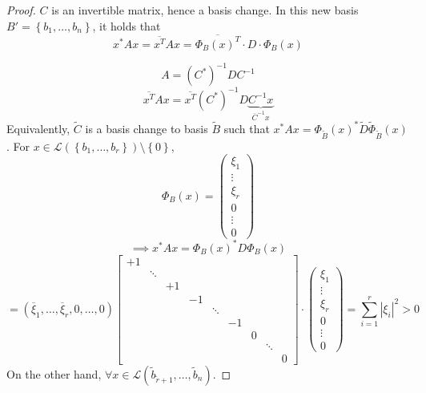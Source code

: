 \documentclass{article}
\newcommand{\set}[1]{\left\{#1\right\}}
\newcommand{\card}[1]{\left|#1\right|}
\begin{document}
\begin{proof}
  $C$ is an invertible matrix, hence a basis change.
  In this new basis $B' = \set{b_1, \dots, b_n}$, it holds that
  \[ x^* A x = \overline{x^T} A x = \overline{\Phi_B(x)^T} \cdot D \cdot \Phi_B(x) \]

  \[ A = (C^*)^{-1} D C^{-1} \]
  \[ \overline{x^T} A x = \overline{x^T} (C^*)^{-1} D \underbrace{C^{-1} x}_{\overline{C}^{-1} x} \]
  Equivalently, $\tilde C$ is a basis change to basis $\tilde B$
  such that $x^* Ax = \Phi_{\tilde B}(x)^* \tilde D \tilde\Phi_{\tilde B}(x)$.
  For $x \in \mathcal L(\set{b_1, \dots, b_r}) \setminus \set{0}$,
  \[ \Phi_B(x) = \begin{pmatrix} \xi_1 \\ \vdots \\ \xi_r \\ 0 \\ \vdots \\ 0 \end{pmatrix} \]
  \[ \implies x^* A x = \Phi_B(x)^* D \Phi_B(x) \]
  \[
    = (\overline{\xi}_1, \dots, \overline{\xi}_r, 0, \dots, 0)
    \begin{bmatrix}
       +1 &        &       &    &        &    &   &        & \\
          & \ddots &       &    &        &    &   &        & \\
          &        &    +1 &    &        &    &   &        & \\
          &        &       & -1 &        &    &   &        & \\
          &        &       &    & \ddots &    &   &        & \\
          &        &       &    &        & -1 &   &        & \\
          &        &       &    &        &    & 0 &        & \\
          &        &       &    &        &    &   & \ddots & \\
          &        &       &    &        &    &   &        & 0
    \end{bmatrix} \cdot
    \begin{pmatrix}
      \xi_1 \\ \vdots \\ \xi_r \\ 0 \\ \vdots \\ 0
    \end{pmatrix}
    = \sum_{i=1}^r \card{\xi_i}^2 > 0
  \]
  On the other hand, $\forall x \in \mathcal L(\tilde b_{\tilde r + 1}, \dots, \tilde b_n)$.

\end{proof}
\end{document}
